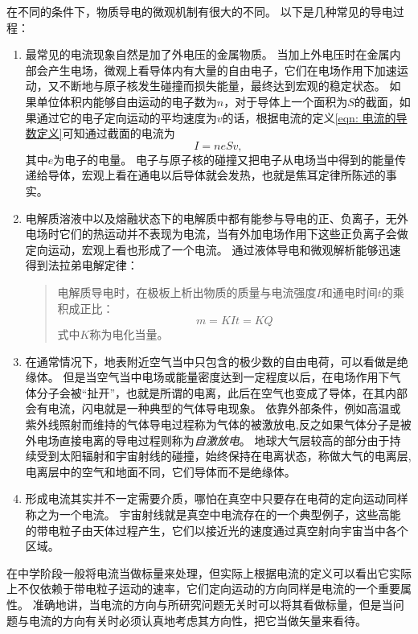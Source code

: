 在不同的条件下，物质导电的微观机制有很大的不同。
以下是几种常见的导电过程：
\begin{enumerate}
\item 最常见的电流现象自然是加了外电压的金属物质。
当加上外电压时在金属内部会产生电场，微观上看导体内有大量的自由电子，它们在电场作用下加速运动，又不断地与原子核发生碰撞而损失能量，最终达到宏观的稳定状态。
如果单位体积内能够自由运动的电子数为$n$，对于导体上一个面积为$S$的截面，如果通过它的电子定向运动的平均速度为$v$的话，根据电流的定义\ref{eqn: 电流的导数定义}可知通过截面的电流为
\begin{equation}
I=neSv,
\end{equation}
其中$e$为电子的电量。
电子与原子核的碰撞又把电子从电场当中得到的能量传递给导体，宏观上看在通电以后导体就会发热，也就是焦耳定律所陈述的事实。

\item 电解质溶液中以及熔融状态下的电解质中都有能参与导电的正、负离子，无外电场时它们的热运动并不表现为电流，当有外加电场作用下这些正负离子会做定向运动，宏观上看也形成了一个电流。
通过液体导电和微观解析能够迅速得到{\heiti 法拉弟电解定律}：
\begin{quotation}
电解质导电时，在极板上析出物质的质量与电流强度$I$和通电时间$t$的乘积成正比：
\begin{equation}
m=KIt = KQ
\end{equation}
式中$K$称为电化当量。
\end{quotation}


\item 在通常情况下，地表附近空气当中只包含的极少数的自由电荷，可以看做是绝缘体。
但是当空气当中电场或能量密度达到一定程度以后，在电场作用下气体分子会被“扯开”，也就是所谓的{\heiti 电离}，此后在空气也变成了导体，在其内部会有电流，闪电就是一种典型的气体导电现象。
依靠外部条件，例如高温或紫外线照射而维持的气体导电过程称为气体的{\heiti 被激放电},反之如果气体分子是被外电场直接电离的导电过程则称为\emph{自激放电}。
地球大气层较高的部分由于持续受到太阳辐射和宇宙射线的碰撞，始终保持在电离状态，称做大气的{\heiti 电离层},电离层中的空气和地面不同，它们导体而不是绝缘体。


\item 形成电流其实并不一定需要介质，哪怕在真空中只要存在电荷的定向运动同样称之为一个电流。
宇宙射线就是真空中电流存在的一个典型例子，这些高能的带电粒子由天体过程产生，它们以接近光的速度通过真空射向宇宙当中各个区域。

\end{enumerate}


在中学阶段一般将电流当做标量来处理，但实际上根据电流的定义可以看出它实际上不仅依赖于带电粒子运动的速率，它们定向运动的方向同样是电流的一个重要属性。
准确地讲，当电流的方向与所研究问题无关时可以将其看做标量，但是当问题与电流的方向有关时必须认真地考虑其方向性，把它当做矢量来看待。

